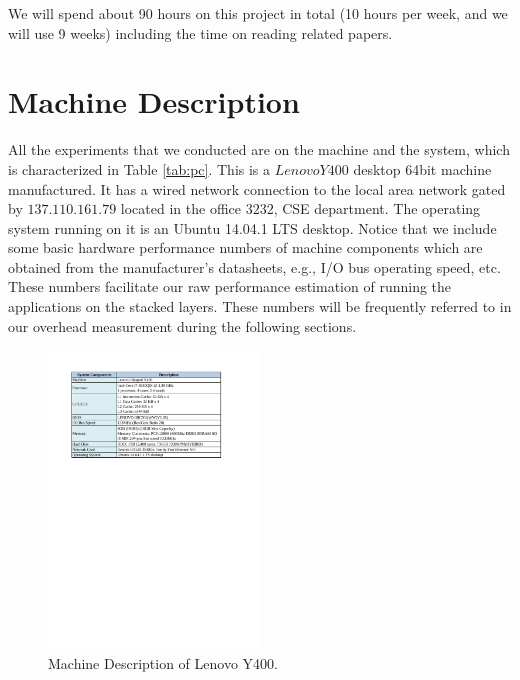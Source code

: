 We will spend about 90 hours on this project in total (10 hours per week, and we will use 9 weeks) including the time on reading related papers.

\section{Machine Description}
\label{sec:pc}
All the experiments that we conducted are on the machine and the system, which is characterized in Table \ref{tab:pc}.
This is a $Lenovo Y400$ desktop 64bit machine manufactured. It has a wired network connection to the local area network gated by $137.110.161.79$ located in the office $3232$, CSE department. The operating system running on it is an Ubuntu 14.04.1 LTS desktop.
Notice that we include some basic hardware performance numbers of machine components which are obtained from the manufacturer's datasheets, e.g., I/O bus operating speed, etc. These numbers facilitate our raw performance estimation of running the applications on the stacked layers. These numbers will be frequently referred to in our overhead measurement during the following sections.


\begin{figure}[!htp]
\centering
\includegraphics[width=0.5\textwidth]{figs/Machine_Description.pdf}
 \caption{Machine Description of Lenovo Y400.}
\end{figure}


